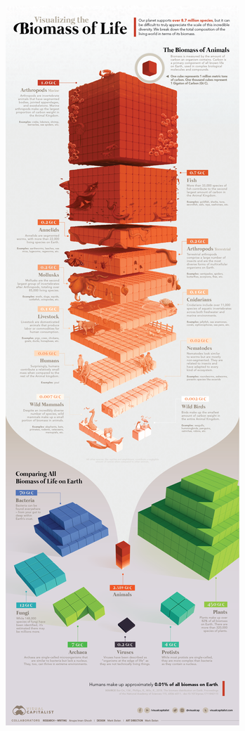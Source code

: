 \teteSndAP
\vspace*{-36pt}

\begin{multicols}{2}

\includegraphics[height=\textheight]{accompagnement_personnel/Visualizing-the-biomass-of-earth}


\end{multicols}
